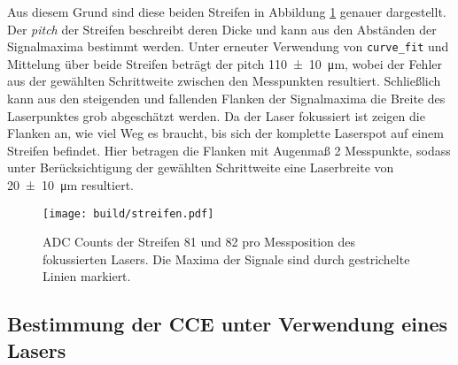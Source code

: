 Aus diesem Grund sind diese beiden Streifen in Abbildung \ref{fig:streifen}
genauer dargestellt. Der \emph{pitch} der Streifen beschreibt deren Dicke
und kann aus den Abständen der Signalmaxima bestimmt werden.
%
Unter erneuter Verwendung von \texttt{curve\_fit} und Mittelung über beide Streifen
beträgt der pitch \SI{110(10)}{\micro\meter}, wobei der Fehler aus der gewählten
Schrittweite zwischen den Messpunkten resultiert.
Schließlich kann aus den steigenden und fallenden Flanken der Signalmaxima die
Breite des Laserpunktes grob abgeschätzt werden.
Da der Laser fokussiert ist zeigen die Flanken an, wie viel Weg es braucht, bis
sich der komplette Laserspot auf einem Streifen befindet.
Hier betragen die Flanken mit Augenmaß 2 Messpunkte, sodass unter Berücksichtigung
der gewählten Schrittweite eine Laserbreite von \SI{20(10)}{\micro\meter} resultiert.
\begin{figure}
  \centering
  \texttt{[image: build/streifen.pdf]}  %
  \caption{ADC Counts der Streifen 81 und 82 pro Messposition des fokussierten
  Lasers. Die Maxima der Signale sind durch gestrichelte Linien markiert.}
  \label{fig:streifen}
\end{figure}

\FloatBarrier
\subsection{Bestimmung der CCE unter Verwendung eines Lasers}
\label{sec:CCEL-Auswertung}

